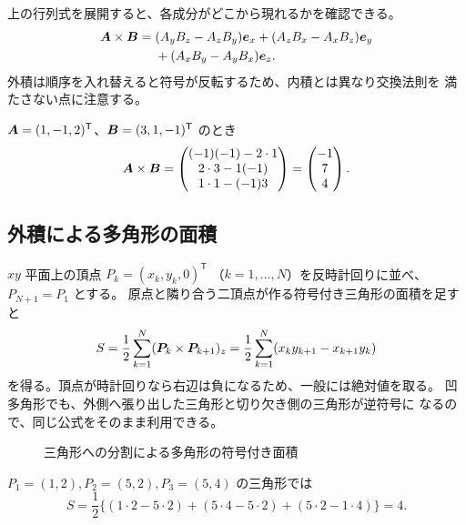 上の行列式を展開すると、各成分がどこから現れるかを確認できる。
\begin{align}
 \bm{A}\times\bm{B}
 ={}&(A_yB_z-A_zB_y)\bm{e}_{x}
 +(A_zB_x-A_xB_z)\bm{e}_{y} \notag\\
 &+(A_xB_y-A_yB_x)\bm{e}_{z}.
\end{align}
外積は順序を入れ替えると符号が反転するため、内積とは異なり交換法則を
満たさない点に注意する。

\begin{example}
$\bm{A}=(1,-1,2)^{\mathsf T}$、$\bm{B}=(3,1,-1)^{\mathsf T}$ のとき
\begin{equation}
 \bm{A}\times\bm{B}
 =\begin{pmatrix}(-1)(-1)-2\cdot1\\2\cdot3-1(-1)\\1\cdot1-(-1)3\end{pmatrix}
 =\begin{pmatrix}-1\\7\\4\end{pmatrix}.
\end{equation}
\end{example}

\subsection{外積による多角形の面積}

$xy$ 平面上の頂点 $P_k=(x_k,y_k,0)^{\mathsf T}$
（$k=1,\ldots,N$）を反時計回りに並べ、$P_{N+1}=P_1$ とする。
原点と隣り合う二頂点が作る符号付き三角形の面積を足すと
\begin{equation}
 S=\frac12\sum_{k=1}^{N}(\bm{P}_k\times\bm{P}_{k+1})_z
  =\frac12\sum_{k=1}^{N}(x_ky_{k+1}-x_{k+1}y_k)
\end{equation}
を得る。頂点が時計回りなら右辺は負になるため、一般には絶対値を取る。
凹多角形でも、外側へ張り出した三角形と切り欠き側の三角形が逆符号に
なるので、同じ公式をそのまま利用できる。

\begin{figure}[htbp]
  \centering
  \caption{三角形への分割による多角形の符号付き面積}
\end{figure}

\begin{example}
$P_1=(1,2),P_2=(5,2),P_3=(5,4)$ の三角形では
\begin{equation}
 S=\frac12\{(1\cdot2-5\cdot2)+(5\cdot4-5\cdot2)
 +(5\cdot2-1\cdot4)\}=4.
\end{equation}
\end{example}
